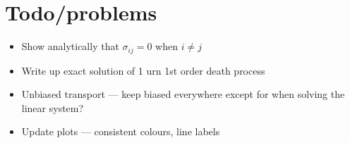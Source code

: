 \FloatBarrier
\section{Todo/problems}
\begin{itemize}
    \item Show analytically that \(\sigma_{ij} = 0\) when \(i \neq j\)
    \item Write up exact solution of 1 urn 1st order death process
    \item Unbiased transport --- keep biased everywhere except for when solving
        the linear system?
    \item Update plots --- consistent colours, line labels
\end{itemize}
